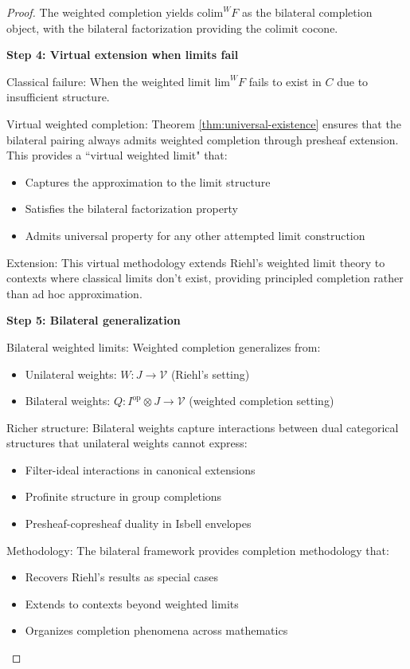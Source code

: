 \documentclass[11pt]{article}
\theoremstyle{plain}
\theoremstyle{definition}
\theoremstyle{remark}
\newcommand{\V}{\mathcal{V}}
\newcommand{\op}{\mathrm{op}}
\newcommand{\colim}{\mathrm{colim}}
\renewcommand{\lim}{\mathrm{lim}}
\begin{document}
\begin{proof}
The weighted completion yields $\colim^W F$ as the bilateral completion object, with the bilateral factorization providing the colimit cocone.

\textbf{Step 4: Virtual extension when limits fail}

Classical failure: When the weighted limit $\lim^W F$ fails to exist in $C$ due to insufficient structure.

Virtual weighted completion: Theorem \ref{thm:universal-existence} ensures that the bilateral pairing always admits weighted completion through presheaf extension. This provides a ``virtual weighted limit" that:
\begin{itemize}
\item Captures the approximation to the limit structure
\item Satisfies the bilateral factorization property
\item Admits universal property for any other attempted limit construction
\end{itemize}

Extension: This virtual methodology extends Riehl's weighted limit theory to contexts where classical limits don't exist, providing principled completion rather than ad hoc approximation.

\textbf{Step 5: Bilateral generalization}

Bilateral weighted limits: Weighted completion generalizes from:
\begin{itemize}
\item Unilateral weights: $W : J \to \V$ (Riehl's setting)
\item Bilateral weights: $Q : I^{\op} \otimes J \to \V$ (weighted completion setting)
\end{itemize}

Richer structure: Bilateral weights capture interactions between dual categorical structures that unilateral weights cannot express:
\begin{itemize}
\item Filter-ideal interactions in canonical extensions
\item Profinite structure in group completions  
\item Presheaf-copresheaf duality in Isbell envelopes
\end{itemize}

Methodology: The bilateral framework provides completion methodology that:
\begin{itemize}
\item Recovers Riehl's results as special cases
\item Extends to contexts beyond weighted limits
\item Organizes completion phenomena across mathematics
\end{itemize}


\end{proof}
\end{document}
